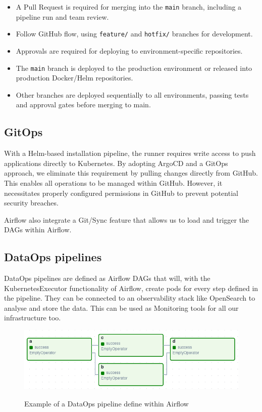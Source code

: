 \begin{itemize}
    \item A Pull Request is required for merging into the \texttt{main} branch, including a pipeline run and team review.
    \item Follow GitHub flow, using \texttt{feature/} and \texttt{hotfix/} branches for development.
    \item Approvals are required for deploying to environment-specific repositories.
    \item The \texttt{main} branch is deployed to the production environment or released into production Docker/Helm repositories.
    \item Other branches are deployed sequentially to all environments, passing tests and approval gates before merging to main.
\end{itemize}

\subsection{GitOps}
With a Helm-based installation pipeline, the runner requires write access to push applications directly to Kubernetes.
By adopting ArgoCD and a GitOps approach, we eliminate this requirement by pulling changes directly from GitHub.
This enables all operations to be managed within GitHub.
However, it necessitates properly configured permissions in GitHub to prevent potential security breaches.

Airflow also integrate a Git/Sync feature that allows us to load and trigger the DAGs within Airflow.

\subsection{DataOps pipelines}
DataOps pipelines are defined as Airflow DAGs that will, with the KubernetesExecutor functionality of Airflow,
create pods for every step defined in the pipeline.
They can be connected to an observability stack like OpenSearch to analyse and store the data.
This can be used as Monitoring tools for all our infrastructure too.

\begin{figure}[!htbp]
    \centering
    \caption{Example of a DataOps pipeline define within Airflow}
    \includegraphics[scale=0.5]{images/project/data-ops-airflow-dag}
    \label{fig:project-data-ops-airflow-dag}
\end{figure}

